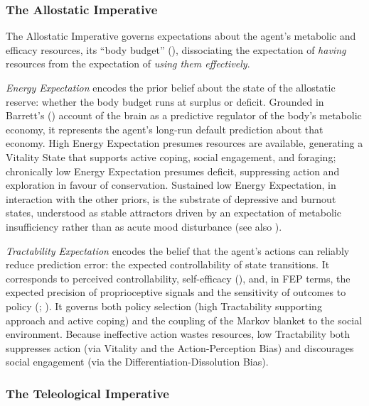 \documentclass[
  jou,
  floatsintext,
  longtable,
  nolmodern,
  notxfonts,
  notimes,
  12pt,
  colorlinks=true,linkcolor=blue,citecolor=blue,urlcolor=blue]{apa7}
\begin{document}
\subsubsection{The Allostatic
Imperative}\label{the-allostatic-imperative}

The Allostatic Imperative governs expectations about the agent's
metabolic and efficacy resources, its ``body budget''
(), dissociating the
expectation of \emph{having} resources from the expectation of
\emph{using them effectively}.

\emph{Energy Expectation} encodes the prior belief about the state of
the allostatic reserve: whether the body budget runs at surplus or
deficit. Grounded in Barrett's ()
account of the brain as a predictive regulator of the body's metabolic
economy, it represents the agent's long-run default prediction about
that economy. High Energy Expectation presumes resources are available,
generating a Vitality State that supports active coping, social
engagement, and foraging; chronically low Energy Expectation presumes
deficit, suppressing action and exploration in favour of conservation.
Sustained low Energy Expectation, in interaction with the other priors,
is the substrate of depressive and burnout states, understood as stable
attractors driven by an expectation of metabolic insufficiency rather
than as acute mood disturbance (see also
).

\emph{Tractability Expectation} encodes the belief that the agent's
actions can reliably reduce prediction error: the expected
controllability of state transitions. It corresponds to perceived
controllability, self-efficacy
(), and, in FEP
terms, the expected precision of proprioceptive signals and the
sensitivity of outcomes to policy
(;
). It governs
both policy selection (high Tractability supporting approach and active
coping) and the coupling of the Markov blanket to the social
environment. Because ineffective action wastes resources, low
Tractability both suppresses action (via Vitality and the
Action-Perception Bias) and discourages social engagement (via the
Differentiation-Dissolution Bias).

\subsubsection{The Teleological
Imperative}\label{the-teleological-imperative}
\end{document}

